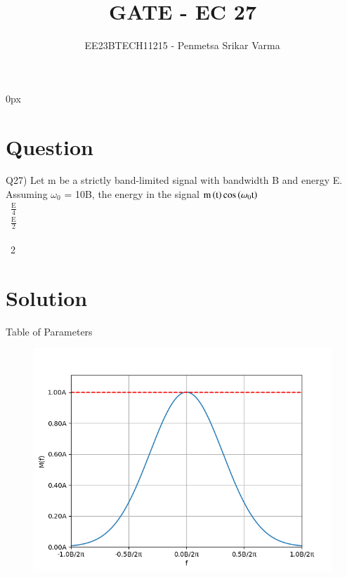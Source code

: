 \documentclass[beamer]{IEEEtran}
\theoremstyle{remark}
\begin{document}
\parindent 0px


\title{GATE - EC 27}
\author{EE23BTECH11215 - Penmetsa Srikar Varma$^{}$%
}
\maketitle
\newpage
\bigskip

\renewcommand{\thefigure}{\theenumi}
\renewcommand{\thetable}{\theenumi}
\section*{Question}
Q27) Let m be a strictly band-limited signal with bandwidth B and energy E. Assuming $\omega_0$ = 10B, the energy in the signal $\text{m}\left(\text{t}\right)\text{cos}\left(\omega_0\text{t}\right)$\\[1ex]
\ $\frac{\text{E}}{4}$\\[1ex]
\ $\frac{\text{E}}{2}$\\[1ex]
\ \\[1ex]
\ 2 \qquad\qquad\qquad\quad\qquad\qquad\qquad\qquad{}
\section*{Solution}
\begin{table}[h]
    \centering
    
    \label{tab:my_label}
\end{table}
\begin{center}
    Table of Parameters\\[5ex]
\end{center}

\begin{figure}[h]
    \centering
    \includegraphics[scale=0.50]{figs/ec,27.png}
    \label{fig:enter-label}
\end{figure}
\end{document}
